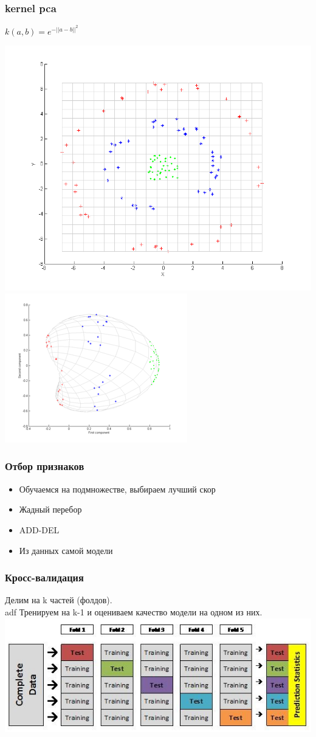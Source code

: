 \documentclass[14pt]{beamer}
\begin{document}
\begin{frame}
\frametitle{kernel pca}
	\begin{center}
		$k(a,b)=e^{-||a-b||^2}$
	\end{center}
	\includegraphics[width=0.5\linewidth]{kerpca1.png}
	\includegraphics[width=0.5\linewidth]{kerpca2.png}
\end{frame}

\begin{frame}
	\frametitle{Отбор признаков}
	\begin{itemize}
			\item Обучаемся на подмножестве, выбираем лучший скор
			\item Жадный перебор
			\item ADD-DEL
			\item Из данных самой модели
	\end{itemize}
\end{frame}

\begin{frame}
	\frametitle{Кросс-валидация}
	Делим на k частей (фолдов).\\
	adf
	Тренируем на k-1 и оцениваем качество модели на одном из них.\\[1em]
	\includegraphics[width=\linewidth]{cv.png}
\end{frame}
\end{document}
